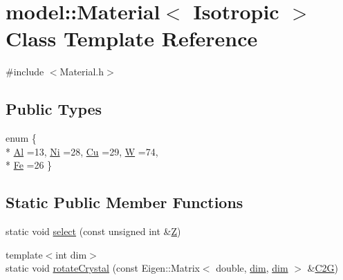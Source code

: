 \hypertarget{classmodel_1_1_material_3_01_isotropic_01_4}{}\section{model\+:\+:Material$<$ Isotropic $>$ Class Template Reference}
\label{classmodel_1_1_material_3_01_isotropic_01_4}


{\ttfamily \#include $<$Material.\+h$>$}

\subsection*{Public Types}
\begin{DoxyCompactItemize}
\item 
enum \{ \\*
\hyperlink{classmodel_1_1_material_3_01_isotropic_01_4_acff07335ca01cc67f3774f9adaa7c451ae1b923e3af2da53677cf425c61658113}{Al} =13, 
\hyperlink{classmodel_1_1_material_3_01_isotropic_01_4_acff07335ca01cc67f3774f9adaa7c451a658f5a9e6001015b645516c62a50d049}{Ni} =28, 
\hyperlink{classmodel_1_1_material_3_01_isotropic_01_4_acff07335ca01cc67f3774f9adaa7c451a5df74092d798757cbece688906116025}{Cu} =29, 
\hyperlink{classmodel_1_1_material_3_01_isotropic_01_4_acff07335ca01cc67f3774f9adaa7c451aab5f2e9cb07a9747a51eaee2886fa259}{W} =74, 
\\*
\hyperlink{classmodel_1_1_material_3_01_isotropic_01_4_acff07335ca01cc67f3774f9adaa7c451a4ee21b4f0f37a966071db717c45b0a6e}{Fe} =26
 \}
\end{DoxyCompactItemize}
\subsection*{Static Public Member Functions}
\begin{DoxyCompactItemize}
\item 
static void \hyperlink{classmodel_1_1_material_3_01_isotropic_01_4_a4e67432ed5296e6b5961c7bc91ae8b31}{select} (const unsigned int \&\hyperlink{_cubic_spline_intersection_8m_a9e2500f549c7bc281d7cb9aa8f883282}{Z})
\item 
{\footnotesize template$<$int dim$>$ }\\static void \hyperlink{classmodel_1_1_material_3_01_isotropic_01_4_a819ed813841020ee67efdcda2c4c859f}{rotate\+Crystal} (const Eigen\+::\+Matrix$<$ double, \hyperlink{plot_nd_a_8m_a382f3ca768b275b8d563604f7fc7df73}{dim}, \hyperlink{plot_nd_a_8m_a382f3ca768b275b8d563604f7fc7df73}{dim} $>$ \&\hyperlink{crystal_rotation_8m_a91d1e9da78391186478a7911c79460ad}{C2\+G})
\end{DoxyCompactItemize}
